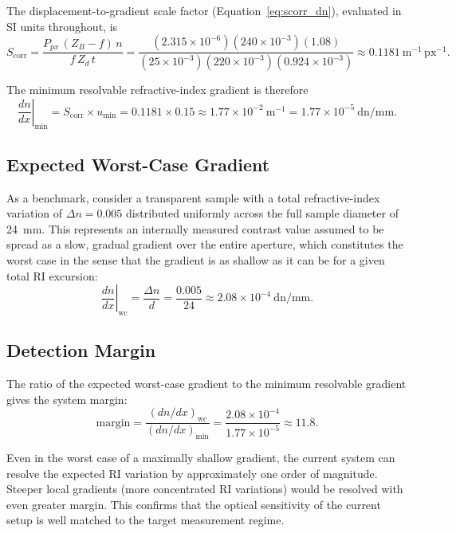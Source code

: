 \documentclass[11pt]{article}
\begin{document}
The displacement-to-gradient scale factor (Equation~\eqref{eq:scorr_dn}),
evaluated in SI units throughout, is
\begin{equation}
  S_{\mathrm{corr}}
  = \frac{P_{px}\,(Z_B - f)\,n}{f\,Z_d\,t}
  = \frac{(2.315\times10^{-6})(240\times10^{-3})(1.08)}
         {(25\times10^{-3})(220\times10^{-3})(0.924\times10^{-3})}
  \approx 0.1181~\mathrm{m}^{-1}\,\mathrm{px}^{-1}.
\end{equation}

The minimum resolvable refractive-index gradient is therefore
\begin{equation}
  \left.\frac{dn}{dx}\right|_{\min}
  = S_{\mathrm{corr}} \times u_{\min}
  = 0.1181 \times 0.15
  \approx 1.77\times10^{-2}~\mathrm{m}^{-1}
  = 1.77\times10^{-5}~\mathrm{dn/mm}.
\end{equation}

\subsection{Expected Worst-Case Gradient}

As a benchmark, consider a transparent sample with a total refractive-index
variation of $\Delta n = 0.005$ distributed uniformly across the full sample
diameter of \SI{24}{mm}. This represents an internally measured contrast
value assumed to be spread as a slow, gradual gradient over the entire
aperture, which constitutes the worst case in the sense that the gradient
is as shallow as it can be for a given total RI excursion:
\begin{equation}
  \left.\frac{dn}{dx}\right|_{\mathrm{wc}}
  = \frac{\Delta n}{d}
  = \frac{0.005}{24}
  \approx 2.08\times10^{-4}~\mathrm{dn/mm}.
\end{equation}

\subsection{Detection Margin}

The ratio of the expected worst-case gradient to the minimum resolvable
gradient gives the system margin:
\begin{equation}
  \text{margin}
  = \frac{(dn/dx)_{\mathrm{wc}}}{(dn/dx)_{\min}}
  = \frac{2.08\times10^{-4}}{1.77\times10^{-5}}
  \approx 11.8.
\end{equation}

Even in the worst case of a maximally shallow gradient, the current
system can resolve the expected RI variation by approximately one order
of magnitude. Steeper local gradients (more concentrated RI variations)
would be resolved with even greater margin. This confirms that the
optical sensitivity of the current setup is well matched to the target
measurement regime.
\end{document}
